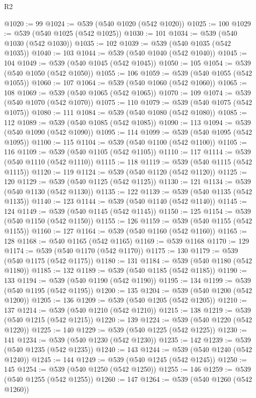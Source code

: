 \begin{lexlean}{R2}
\begin{coremodule}
@1020 := 99
@1024 := @539 (@540 @1020 (@542 @1020))
@1025 := 100
@1029 := @539 (@540 @1025 (@542 @1025))
@1030 := 101
@1034 := @539 (@540 @1030 (@542 @1030))
@1035 := 102
@1039 := @539 (@540 @1035 (@542 @1035))
@1040 := 103
@1044 := @539 (@540 @1040 (@542 @1040))
@1045 := 104
@1049 := @539 (@540 @1045 (@542 @1045))
@1050 := 105
@1054 := @539 (@540 @1050 (@542 @1050))
@1055 := 106
@1059 := @539 (@540 @1055 (@542 @1055))
@1060 := 107
@1064 := @539 (@540 @1060 (@542 @1060))
@1065 := 108
@1069 := @539 (@540 @1065 (@542 @1065))
@1070 := 109
@1074 := @539 (@540 @1070 (@542 @1070))
@1075 := 110
@1079 := @539 (@540 @1075 (@542 @1075))
@1080 := 111
@1084 := @539 (@540 @1080 (@542 @1080))
@1085 := 112
@1089 := @539 (@540 @1085 (@542 @1085))
@1090 := 113
@1094 := @539 (@540 @1090 (@542 @1090))
@1095 := 114
@1099 := @539 (@540 @1095 (@542 @1095))
@1100 := 115
@1104 := @539 (@540 @1100 (@542 @1100))
@1105 := 116
@1109 := @539 (@540 @1105 (@542 @1105))
@1110 := 117
@1114 := @539 (@540 @1110 (@542 @1110))
@1115 := 118
@1119 := @539 (@540 @1115 (@542 @1115))
@1120 := 119
@1124 := @539 (@540 @1120 (@542 @1120))
@1125 := 120
@1129 := @539 (@540 @1125 (@542 @1125))
@1130 := 121
@1134 := @539 (@540 @1130 (@542 @1130))
@1135 := 122
@1139 := @539 (@540 @1135 (@542 @1135))
@1140 := 123
@1144 := @539 (@540 @1140 (@542 @1140))
@1145 := 124
@1149 := @539 (@540 @1145 (@542 @1145))
@1150 := 125
@1154 := @539 (@540 @1150 (@542 @1150))
@1155 := 126
@1159 := @539 (@540 @1155 (@542 @1155))
@1160 := 127
@1164 := @539 (@540 @1160 (@542 @1160))
@1165 := 128
@1168 := @540 @1165 (@542 @1165)
@1169 := @539 @1168
@1170 := 129
@1174 := @539 (@540 @1170 (@542 @1170))
@1175 := 130
@1179 := @539 (@540 @1175 (@542 @1175))
@1180 := 131
@1184 := @539 (@540 @1180 (@542 @1180))
@1185 := 132
@1189 := @539 (@540 @1185 (@542 @1185))
@1190 := 133
@1194 := @539 (@540 @1190 (@542 @1190))
@1195 := 134
@1199 := @539 (@540 @1195 (@542 @1195))
@1200 := 135
@1204 := @539 (@540 @1200 (@542 @1200))
@1205 := 136
@1209 := @539 (@540 @1205 (@542 @1205))
@1210 := 137
@1214 := @539 (@540 @1210 (@542 @1210))
@1215 := 138
@1219 := @539 (@540 @1215 (@542 @1215))
@1220 := 139
@1224 := @539 (@540 @1220 (@542 @1220))
@1225 := 140
@1229 := @539 (@540 @1225 (@542 @1225))
@1230 := 141
@1234 := @539 (@540 @1230 (@542 @1230))
@1235 := 142
@1239 := @539 (@540 @1235 (@542 @1235))
@1240 := 143
@1244 := @539 (@540 @1240 (@542 @1240))
@1245 := 144
@1249 := @539 (@540 @1245 (@542 @1245))
@1250 := 145
@1254 := @539 (@540 @1250 (@542 @1250))
@1255 := 146
@1259 := @539 (@540 @1255 (@542 @1255))
@1260 := 147
@1264 := @539 (@540 @1260 (@542 @1260))

\end{coremodule}
\end{lexlean}
